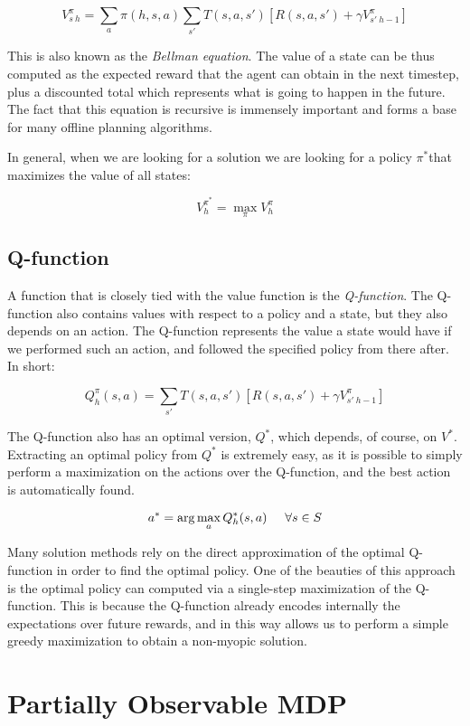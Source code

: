 \[ V^{\pi}_{s\:h} = \sum_a \pi(h, s, a) \sum_{s'} T(s, a, s') \left [ R(s, a, s') + \gamma
V^{\pi}_{s'\:h-1} \right ] \]

This is also known as the \textit{Bellman equation}. The value of a state can be thus computed as
the expected reward that the agent can obtain in the next timestep, plus a discounted total which
represents what is going to happen in the future. The fact that this equation is recursive is
immensely important and forms a base for many offline planning algorithms.

In general, when we are looking for a solution we are looking for a policy $\pi^*$that maximizes the value
of all states:

\[ V^{\pi^*}_h = \max_\pi V^{\pi}_h \]

\subsection{Q-function}

A function that is closely tied with the value function is the \textit{Q-function}. The Q-function
also contains values with respect to a policy and a state, but they also depends on an action. The
Q-function represents the value a state would have if we performed such an action, and followed the
specified policy from there after. In short:

\[ Q^{\pi}_{h}(s,a) = \sum_{s'} T(s, a, s') \left [ R(s, a, s') + \gamma
V^{\pi}_{s'\:h-1} \right ] \]

The Q-function also has an optimal version, $Q^*$, which depends, of course, on $V^*$. Extracting an
optimal policy from $Q^*$ is extremely easy, as it is possible to simply perform a maximization on
the actions over the Q-function, and the best action is automatically found.

\[ a^* = \arg\max_a Q^*_h(s,a) \hspace{.5cm}\forall s \in S\]

Many solution methods rely on the direct approximation of the optimal Q-function in order to find
the optimal policy. One of the beauties of this approach is the optimal policy can computed via a
single-step maximization of the Q-function. This is because the Q-function already encodes
internally the expectations over future rewards, and in this way allows us to perform a simple
greedy maximization to obtain a non-myopic solution.

\section{Partially Observable MDP}\label{ref:pomdp}


